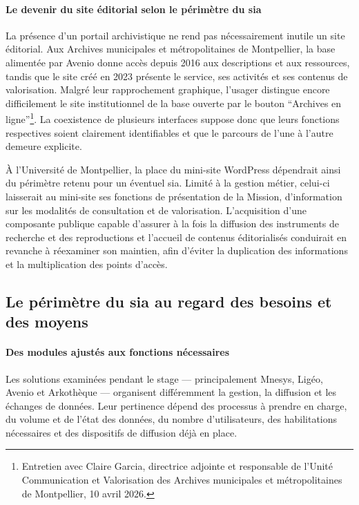 \paragraph{Le devenir du site éditorial selon le périmètre du \gls{sia}}

La présence d'un portail archivistique ne rend pas nécessairement inutile un site éditorial. Aux Archives municipales et métropolitaines de Montpellier, la base alimentée par Avenio donne accès depuis 2016 aux descriptions et aux ressources, tandis que le site créé en 2023 présente le service, ses activités et ses contenus de valorisation. Malgré leur rapprochement graphique, l'usager distingue encore difficilement le site institutionnel de la base ouverte par le bouton \enquote{Archives en ligne}\footnote{Entretien avec Claire Garcia, directrice adjointe et responsable de l'Unité Communication et Valorisation des Archives municipales et métropolitaines de Montpellier, 10 avril 2026.}. La coexistence de plusieurs interfaces suppose donc que leurs fonctions respectives soient clairement identifiables et que le parcours de l'une à l'autre demeure explicite.

À l'Université de Montpellier, la place du mini-site WordPress dépendrait ainsi du périmètre retenu pour un éventuel \gls{sia}. Limité à la gestion métier, celui-ci laisserait au mini-site ses fonctions de présentation de la Mission, d'information sur les modalités de consultation et de valorisation. L'acquisition d'une composante publique capable d'assurer à la fois la diffusion des instruments de recherche et des reproductions et l'accueil de contenus éditorialisés conduirait en revanche à réexaminer son maintien, afin d'éviter la duplication des informations et la multiplication des points d'accès.


\subsection{Le périmètre du \gls{sia} au regard des besoins et des moyens}

\paragraph{Des modules ajustés aux fonctions nécessaires}

Les solutions examinées pendant le stage --- principalement Mnesys, Ligéo, Avenio et Arkothèque --- organisent différemment la gestion, la diffusion et les échanges de données. Leur pertinence dépend des processus à prendre en charge, du volume et de l'état des données, du nombre d'utilisateurs, des habilitations nécessaires et des dispositifs de diffusion déjà en place.

